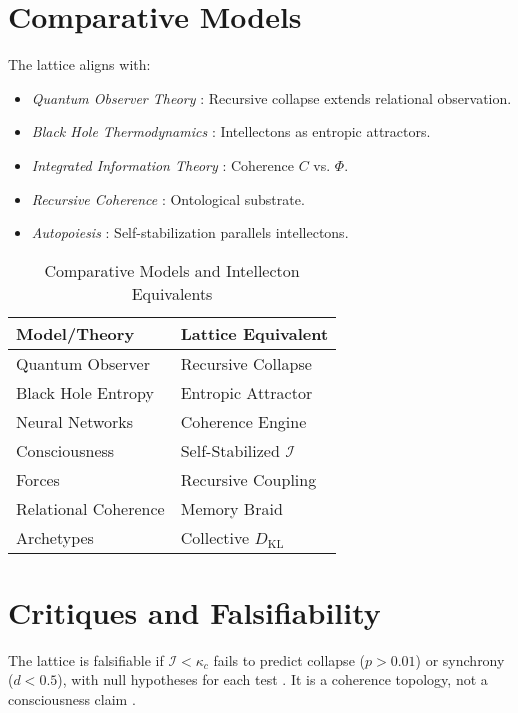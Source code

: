 \documentclass[11pt]{article}
\newcommand{\intellecton}{\mathcal{I}} %
\newcommand{\dkl}{D_{\text{KL}}}
\begin{document}
\section{Comparative Models}
\label{sec:comparative}
The lattice aligns with:
\begin{itemize}
    \item \textit{Quantum Observer Theory} \citep{wigner1961}: Recursive collapse extends relational observation.
    \item \textit{Black Hole Thermodynamics} \citep{susskind2023}: Intellectons as entropic attractors.
    \item \textit{Integrated Information Theory} \citep{tononi2023}: Coherence $C$ vs. $\Phi$.
    \item \textit{Recursive Coherence} \citep{hofstadter1979}: Ontological substrate.
    \item \textit{Autopoiesis} \citep{varela1974}: Self-stabilization parallels intellectons.
\end{itemize}

\begin{table}[h]
\centering
\caption{Comparative Models and Intellecton Equivalents}
\begin{tabular}{ll}
\toprule
Model/Theory & Lattice Equivalent \\
\midrule
Quantum Observer & Recursive Collapse \\
Black Hole Entropy & Entropic Attractor \\
Neural Networks & Coherence Engine \\
Consciousness & Self-Stabilized $\intellecton$ \\
Forces & Recursive Coupling \\
Relational Coherence & Memory Braid \\
Archetypes & Collective $\dkl$ \\
\bottomrule
\end{tabular}
\label{tab:comparative}
\end{table}

\section{Critiques and Falsifiability}
\label{sec:critiques}
The lattice is falsifiable if $\intellecton < \kappa_c$ fails to predict collapse ($p > 0.01$) or synchrony ($d < 0.5$), with null hypotheses for each test \citep{huelga2022}. It is a coherence topology, not a consciousness claim \citep{penrose2024}.
\end{document}
